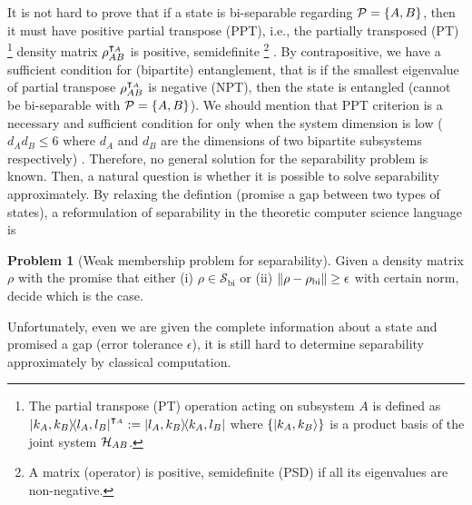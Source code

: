 \documentclass[
aps,
pra,
twocolumn,
floatfix,
]{revtex4-2}
\theoremstyle{plain}
\newtheorem{theorem}{Theorem}
\theoremstyle{definition}
\newtheorem{problem}{Problem}
\newcommand{\dm}{\rho}
\newcommand{\bi}{\text{bi}}
\newcommand{\ppt}{\textup{PPT}}
\newcommand{\separableset}{\mathcal{S}}
\newcommand{\ppartition}{\mathcal{P}}
\begin{document}
It is not hard to prove that if a state is bi-separable regarding $\ppartition=\qty{A,B}$, then it must have positive partial transpose (PPT),
i.e., 
the partially transposed (PT) 
\footnote{
	The partial transpose (PT) operation acting on subsystem $A$ is defined as
	$\op{k_A,k_B}{l_A,l_B}^{\intercal_A} := \op{l_A,k_B}{k_A,l_B}$
	where $\qty{\ket{k_A,k_B}}$ is a product basis of the joint system $\mathcal{H}_{AB}$.
}
density matrix $\dm_{AB}^{\T_A}$ is positive, semidefinite \footnote{A matrix (operator) is positive, semidefinite (PSD) if all its eigenvalues are non-negative.} \cite{peresSeparabilityCriterionDensity1996,horodeckiSeparabilityMixedStates1996}.
By contrapositive, we have a sufficient condition for (bipartite) entanglement, that is
	if the smallest eigenvalue of partial transpose $\dm_{AB}^{\T_A}$ is negative (NPT), then the state is entangled (cannot be bi-separable with $\ppartition=\qty{A,B}$).
We should mention that PPT criterion is a necessary and sufficient condition for  only when the system dimension is low ($d_A d_B \le 6$ where $d_A$ and $d_B$ are the dimensions of two bipartite subsystems respectively) \cite{horodeckiSeparabilityMixedStates1996}.
Therefore, no general solution for the separability problem is known.
Then, a natural question is whether it is possible to solve separability approximately.
By relaxing the defintion (promise a gap between two types of states), a reformulation of separability in the theoretic computer science language is
\begin{problem}[Weak membership problem for separability]\label{prm:weak_membership problem_for_separability}
	Given a density matrix $\dm$ with the promise that either (i) $\dm\in \separableset_{\bi}$ or (ii) $\norm{\dm-\dm_{\bi}}\ge \epsilon$ with certain norm, decide which is the case.
\end{problem}
Unfortunately, even we are given the complete information about a state and promised a gap (error tolerance $\epsilon$), it is still hard to determine separability approximately by classical computation.
\end{document}
